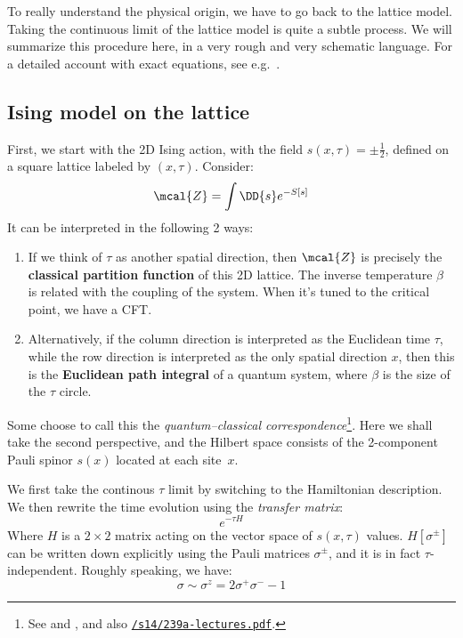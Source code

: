 \documentclass[a4paper
	,10pt
]{article}
\begin{document}
	To really understand the physical origin, we have to go back to the lattice model. Taking the continuous limit of the lattice model is quite a subtle process. We will summarize this procedure here, in a very rough and very schematic language. For a detailed account with exact equations, see e.g.~\cite{Atanasov:2017abc,Kogut:1979wt,Fradkin:1991nr}. 
\subsection{Ising model on the lattice}
	First, we start with the 2D Ising action, with the field $s(x,\tau) = \pm\frac{1}{2}$, defined on a square lattice labeled by $(x,\tau)$. Consider:
	\begin{equation}
		\mcal{Z} = \int \DD{s} e^{-S[s]}
	\end{equation}
	It can be interpreted in the following 2 ways:
	\begin{enumerate}
	\item If we think of $\tau$ as another spatial direction, then $\mcal{Z}$ is precisely the \textbf{classical partition function} of this 2D lattice. The inverse temperature $\beta$ is related with the coupling of the system. When it's tuned to the critical point, we have a CFT. 
	
	\item Alternatively, if the column direction is interpreted as the Euclidean time $\tau$, while the row direction is interpreted as the only spatial direction $x$, then this is the \textbf{Euclidean path integral} of a quantum system, where $\beta$ is the size of the $\tau$ circle. 
	\end{enumerate}
	
	Some choose to call this the \textit{quantum--classical correspondence}\footnote{
		See \cite{Simmons-Duffin:2016gjk} and , and also \href{https://mcgreevy.physics.ucsd.edu/s14/239a-lectures.pdf}{\texttt{/s14/239a-lectures.pdf}}. 
	}. Here we shall take the second perspective, and the Hilbert space consists of the 2-component Pauli spinor $s(x)$ located at each site~$x$. 
	
	We first take the continous $\tau$ limit by switching to the Hamiltonian description. We then rewrite the time evolution using the \textit{transfer matrix}:
	\begin{equation}
		e^{-\tau H}
	\end{equation}
	Where $H$ is a $2\times 2$ matrix acting on the vector space of $s(x,\tau)$ values. 
	$H[\sigma^\pm]$ can be written down explicitly using the Pauli matrices $\sigma^\pm$, and it is in fact $\tau$-independent. Roughly speaking, we have:
	\begin{equation}
		\sigma \sim \sigma^z
		= 2\sigma^+ \sigma^- - 1
	\end{equation}
	
\end{document}

